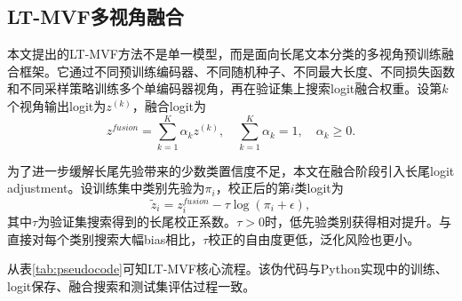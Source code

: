 \documentclass[UTF8, fontset=windows]{ctexart}
\begin{document}
	\subsection{LT-MVF多视角融合}
	
	本文提出的LT-MVF方法不是单一模型，而是面向长尾文本分类的多视角预训练融合框架。它通过不同预训练编码器、不同随机种子、不同最大长度、不同损失函数和不同采样策略训练多个单编码器视角，再在验证集上搜索logit融合权重。设第$k$个视角输出logit为$z^{(k)}$，融合logit为
	\begin{equation}
		z^{fusion}=\sum_{k=1}^{K}\alpha_k z^{(k)},\quad \sum_{k=1}^{K}\alpha_k=1,\quad \alpha_k\geq0.
		\label{eq:fusion}
	\end{equation}
	
	为了进一步缓解长尾先验带来的少数类置信度不足，本文在融合阶段引入长尾logit adjustment。设训练集中类别先验为$\pi_i$，校正后的第$i$类logit为
	\begin{equation}
		\tilde{z}_i=z^{fusion}_i-\tau \log(\pi_i+\epsilon),
		\label{eq:tau}
	\end{equation}
	其中$\tau$为验证集搜索得到的长尾校正系数。$\tau>0$时，低先验类别获得相对提升。与直接对每个类别搜索大幅bias相比，$\tau$校正的自由度更低，泛化风险也更小。
	
	从表\ref{tab:pseudocode}可知LT-MVF核心流程。该伪代码与Python实现中的训练、logit保存、融合搜索和测试集评估过程一致。
	
	\begin{table}[htbp]
		\centering
		\caption{LT-MVF核心流程伪代码}
		\label{tab:pseudocode}
	\end{table}
	
\end{document}
